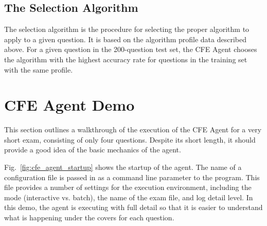 \subsection{The Selection Algorithm}

The selection algorithm is the procedure for selecting the proper algorithm to apply to a given question.  It is based on the algorithm profile data described above.  For a given question in the 200-question test set, the CFE Agent chooses the algorithm with the highest accuracy rate for questions in the training set with the same profile.

\section{CFE Agent Demo}

This section outlines a walkthrough of the execution of the CFE Agent for a very short exam, consisting of only four questions.  Despite its short length, it should provide a good idea of the basic mechanics of the agent.  

Fig.~\ref{fig:cfe_agent_startup} shows the startup of the agent.  The name of a configuration file is passed in as a command line parameter to the program.  This file provides a number of settings for the execution environment, including the mode (interactive vs. batch), the name of the exam file, and log detail level.  In this demo, the agent is executing with full detail so that it is easier to understand what is happening under the covers for each question.

